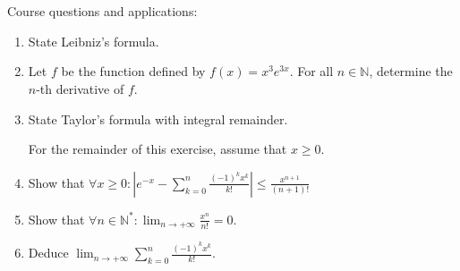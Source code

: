 \documentclass[12pt]{article}
\begin{document}
\newpage

\section{}
Course questions and applications:
\begin{enumerate}
    \item State Leibniz's formula.
    
    \item Let $f$ be the function defined by $f(x) = x^3 e^{3x}$. For all $n \in \mathbb{N}$, determine the $n$-th derivative of $f$.
    
    \item State Taylor's formula with integral remainder.
    
    For the remainder of this exercise, assume that $x \geq 0$.
    
    \item Show that
    $\forall x \geq 0 : \left| e^{-x} - \sum_{k=0}^{n}\frac{(-1)^k x^k}{k!} \right| \leq \frac{x^{n+1}}{(n+1)!}$
    
    \item Show that $\forall n \in \mathbb{N}^* : \lim_{n \to +\infty} \frac{x^n}{n!} = 0$.
    
    \item Deduce $\lim_{n \to +\infty} \sum_{k=0}^{n}\frac{(-1)^k x^k}{k!}$.
\end{enumerate}

\newpage
\end{document}
